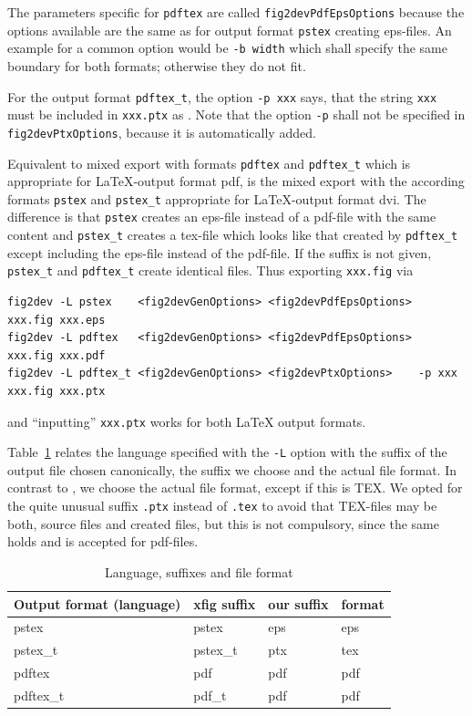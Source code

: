 
The parameters specific for \texttt{pdftex} 
are called \texttt{fig2devPdfEpsOptions} 
because the options available are the same 
as for output format \texttt{pstex} creating eps-files. 
An example for a common option would be \texttt{-b width} 
which shall specify the same boundary for both formats; 
otherwise they do not fit. 

For the output format \texttt{pdftex\_t}, 
the option \texttt{-p xxx} says, 
that the string \texttt{xxx} must be included in \texttt{xxx.ptx} 
as . 
Note that the option \texttt{-p} shall not be specified 
in \texttt{fig2devPtxOptions}, because it is automatically added. 

Equivalent to mixed export with formats \texttt{pdftex} and \texttt{pdftex\_t} 
which is appropriate for \LaTeX-output format pdf, 
is the mixed export with the according formats 
\texttt{pstex} and \texttt{pstex\_t} appropriate for \LaTeX-output format dvi. 
The difference is that \texttt{pstex} creates an eps-file instead of a pdf-file 
with the same content 
and \texttt{pstex\_t} creates a tex-file which looks like that 
created by \texttt{pdftex\_t} except including the eps-file 
instead of the pdf-file. 
If the suffix is not given, 
\texttt{pstex\_t} and \texttt{pdftex\_t} create identical files. 
Thus exporting \texttt{xxx.fig} via 
%
\begin{Verbatim}[fontsize=\scriptsize]
fig2dev -L pstex    <fig2devGenOptions> <fig2devPdfEpsOptions>        xxx.fig xxx.eps   
fig2dev -L pdftex   <fig2devGenOptions> <fig2devPdfEpsOptions>        xxx.fig xxx.pdf   
fig2dev -L pdftex_t <fig2devGenOptions> <fig2devPtxOptions>    -p xxx xxx.fig xxx.ptx
\end{Verbatim}
%
and ``inputting'' \texttt{xxx.ptx} works for both \LaTeX{} output formats. 

Table~\ref{tab:xfigSuffixes} relates the language specified with the \texttt{-L} option 
with the suffix of the output file chosen canonically, the suffix we choose 
and the actual file format. 
In contrast to , 
we choose the actual file format, except if this is TEX\@. 
We opted for the quite unusual suffix \texttt{.ptx} 
instead of \texttt{.tex} 
to avoid that TEX-files may be both, 
source files and created files, 
but this is not compulsory, 
since the same holds and is accepted for pdf-files. 

\begin{longtable}{|l|lll|}
\toprule
Output format (language) & xfig suffix & our suffix & format \\
\midrule
\midrule
\endfirsthead%
\bottomrule%
\caption{\label{tab:xfigSuffixes} Language, suffixes and file format }
\endlastfoot%
pstex                    & pstex       & eps        & eps \\
pstex\_t                 & pstex\_t    & ptx        & tex \\
pdftex                   & pdf         & pdf        & pdf \\
pdftex\_t                & pdf\_t      & pdf        & pdf \\
\end{longtable}


